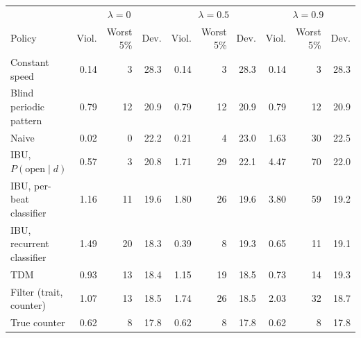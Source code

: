 \begin{tabular}{lrrrrrrrrr}
\toprule
 & \multicolumn{3}{c}{$\lambda=0$} & \multicolumn{3}{c}{$\lambda=0.5$} & \multicolumn{3}{c}{$\lambda=0.9$} \\
Policy & Viol. & Worst 5\% & Dev. & Viol. & Worst 5\% & Dev. & Viol. & Worst 5\% & Dev. \\
\midrule
Constant speed & 0.14 & 3 & 28.3 & 0.14 & 3 & 28.3 & 0.14 & 3 & 28.3 \\
Blind periodic pattern & 0.79 & 12 & 20.9 & 0.79 & 12 & 20.9 & 0.79 & 12 & 20.9 \\
Naive & 0.02 & 0 & 22.2 & 0.21 & 4 & 23.0 & 1.63 & 30 & 22.5 \\
IBU, $P(\mathrm{open}\mid d)$ & 0.57 & 3 & 20.8 & 1.71 & 29 & 22.1 & 4.47 & 70 & 22.0 \\
IBU, per-beat classifier & 1.16 & 11 & 19.6 & 1.80 & 26 & 19.6 & 3.80 & 59 & 19.2 \\
IBU, recurrent classifier & 1.49 & 20 & 18.3 & 0.39 & 8 & 19.3 & 0.65 & 11 & 19.1 \\
TDM & 0.93 & 13 & 18.4 & 1.15 & 19 & 18.5 & 0.73 & 14 & 19.3 \\
Filter (trait, counter) & 1.07 & 13 & 18.5 & 1.74 & 26 & 18.5 & 2.03 & 32 & 18.7 \\
True counter & 0.62 & 8 & 17.8 & 0.62 & 8 & 17.8 & 0.62 & 8 & 17.8 \\
\bottomrule
\end{tabular}
